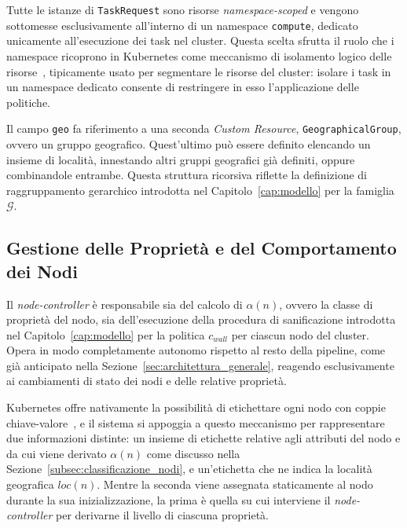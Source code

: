 Tutte le istanze di \texttt{TaskRequest} sono risorse \emph{namespace-scoped} e vengono sottomesse esclusivamente all'interno di un namespace \texttt{compute}, dedicato unicamente all'esecuzione dei task nel cluster. Questa scelta sfrutta il ruolo che i namespace ricoprono in Kubernetes come meccanismo di isolamento logico delle risorse~\cite{k8s-namespaces}, tipicamente usato per segmentare le risorse del cluster: isolare i task in un namespace dedicato consente di restringere in esso l'applicazione delle politiche.

Il campo \texttt{geo} fa riferimento a una seconda \emph{Custom Resource}, \texttt{GeographicalGroup}, ovvero un gruppo geografico. Quest'ultimo può essere definito elencando un insieme di località, innestando altri gruppi geografici già definiti, oppure combinandole entrambe. Questa struttura ricorsiva riflette la definizione di raggruppamento gerarchico introdotta nel Capitolo~\ref{cap:modello} per la famiglia $\mathcal{G}$.


\subsection{Gestione delle Proprietà e del Comportamento dei Nodi}
\label{subsec:node_controller}

Il \emph{node-controller} è responsabile sia del calcolo di $\alpha(n)$, ovvero la classe di proprietà del nodo, sia dell'esecuzione della procedura di sanificazione introdotta nel Capitolo~\ref{cap:modello} per la politica $c_{wall}$ per ciascun nodo del cluster. Opera in modo completamente autonomo rispetto al resto della pipeline, come già anticipato nella Sezione~\ref{sec:architettura_generale}, reagendo esclusivamente ai cambiamenti di stato dei nodi e delle relative proprietà.

Kubernetes offre nativamente la possibilità di etichettare ogni nodo con coppie chiave-valore~\cite{k8s-nodes}, e il sistema si appoggia a questo meccanismo per rappresentare due informazioni distinte: un insieme di etichette relative agli attributi del nodo e da cui viene derivato $\alpha(n)$ come discusso nella Sezione~\ref{subsec:classificazione_nodi}, e un'etichetta che ne indica la località geografica $loc(n)$. Mentre la seconda viene assegnata staticamente al nodo durante la sua inizializzazione, la prima è quella su cui interviene il \emph{node-controller} per derivarne il livello di ciascuna proprietà.

